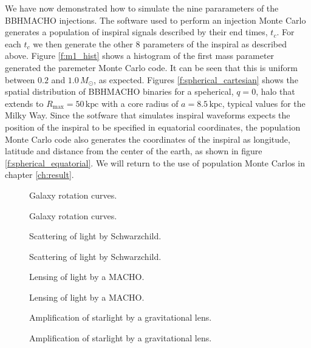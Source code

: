 We have now demonstrated how to simulate the nine pararameters of the BBHMACHO
injections. The software used to perform an injection Monte Carlo generates a
population of inspiral signals described by their end times, $t_c$. For each
$t_c$ we then generate the other 8 parameters of the inspiral as described
above. Figure \ref{f:m1_hist} shows a histogram of the first mass parameter 
generated the paremeter Monte Carlo code. It can be seen that this is uniform
between $0.2$ and $1.0\,M_\odot$, as expected. Figures
\ref{f:spherical_cartesian} shows the spatial distribution of BBHMACHO
binaries for a speherical, $q=0$, halo that extends to $R_\mathrm{max} =
50\,\mathrm{kpc}$ with a core radius of $a = 8.5\,\mathrm{kpc}$, typical
values for the Milky Way. Since the sotfware that simulates inspiral waveforms
expects the position of the inspiral to be specified in equatorial
coordinates, the population Monte Carlo code also generates the coordinates of
the inspiral as longitude, latitude and distance from the center of the
earth, as shown in figure \ref{f:spherical_equatorial}.  We will return to the
use of population Monte Carlos in chapter \ref{ch:result}.

\newpage

\begin{figure}[p]
\begin{center}
Galaxy rotation curves.
\end{center}
\caption{\label{f:rotcurves}%
Galaxy rotation curves.
}
\end{figure}

\begin{figure}[p]
\begin{center}
Scattering of light by Schwarzchild.
\end{center}
\caption{\label{f:scattering}%
Scattering of light by Schwarzchild.
}
\end{figure}

\begin{figure}[p]
\begin{center}
Lensing of light by a MACHO.
\end{center}
\caption{\label{f:macholens}%
Lensing of light by a MACHO.
}
\end{figure}

\begin{figure}[p]
\begin{center}
Amplification of starlight by a gravitational lens.
\end{center}
\caption{\label{f:lightcurves}%
Amplification of starlight by a gravitational lens.
}
\end{figure}

